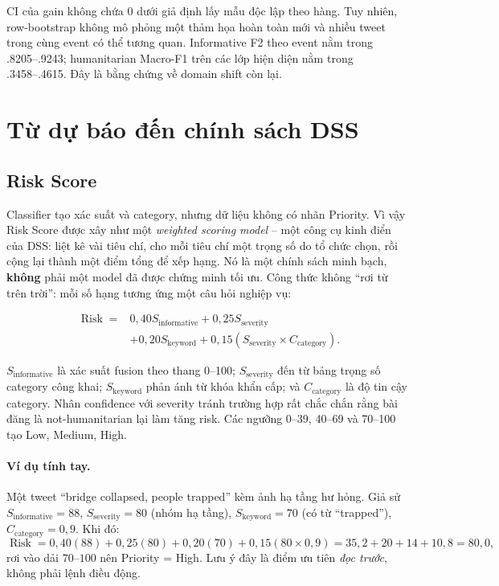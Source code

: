 CI của gain không chứa 0 dưới giả định lấy mẫu độc lập theo hàng. Tuy nhiên,
row-bootstrap không mô phỏng một thảm họa hoàn toàn mới và nhiều tweet trong
cùng event có thể tương quan. Informative F2 theo event nằm trong
.8205--.9243; humanitarian Macro-F1 trên các lớp hiện diện nằm trong
.3458--.4615. Đây là bằng chứng về domain shift còn lại.

\section{Từ dự báo đến chính sách DSS}

\subsection{Risk Score}

Classifier tạo xác suất và category, nhưng dữ liệu không có nhãn Priority. Vì
vậy Risk Score được xây như một \emph{weighted scoring model} -- một công cụ kinh
điển của DSS: liệt kê vài tiêu chí, cho mỗi tiêu chí một trọng số do tổ chức
chọn, rồi cộng lại thành một điểm tổng để xếp hạng. Nó là một chính sách minh
bạch, \textbf{không} phải một model đã được chứng minh tối ưu. Công thức không
``rơi từ trên trời'': mỗi số hạng tương ứng một câu hỏi nghiệp vụ:

\[
\begin{aligned}
\operatorname{Risk}={}&0{,}40S_{\mathrm{informative}}
+0{,}25S_{\mathrm{severity}}\\
&+0{,}20S_{\mathrm{keyword}}
+0{,}15(S_{\mathrm{severity}}\times C_{\mathrm{category}}).
\end{aligned}
\]

\(S_{\mathrm{informative}}\) là xác suất fusion theo thang 0--100;
\(S_{\mathrm{severity}}\) đến từ bảng trọng số category công khai;
\(S_{\mathrm{keyword}}\) phản ánh từ khóa khẩn cấp; và
\(C_{\mathrm{category}}\) là độ tin cậy category. Nhân confidence với severity
tránh trường hợp rất chắc chắn rằng bài đăng là not-humanitarian lại làm tăng
risk. Các ngưỡng 0--39, 40--69 và 70--100 tạo Low, Medium, High.

\paragraph{Ví dụ tính tay.} Một tweet ``bridge collapsed, people trapped'' kèm
ảnh hạ tầng hư hỏng. Giả sử \(S_{\mathrm{informative}}=88\),
\(S_{\mathrm{severity}}=80\) (nhóm hạ tầng), \(S_{\mathrm{keyword}}=70\) (có từ
``trapped''), \(C_{\mathrm{category}}=0{,}9\). Khi đó:
\[
\operatorname{Risk}=0{,}40(88)+0{,}25(80)+0{,}20(70)+0{,}15(80\times0{,}9)
=35{,}2+20+14+10{,}8=80{,}0,
\]
rơi vào dải \(70\)--\(100\) nên Priority = High. Lưu ý đây là điểm ưu tiên
\emph{đọc trước}, không phải lệnh điều động.

